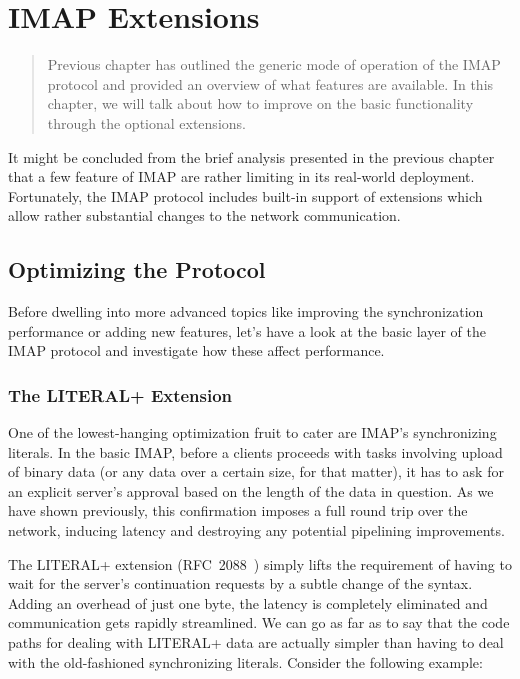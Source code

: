 \documentclass[trojita]{subfiles}
\begin{document}
\chapter{IMAP Extensions}
\label{sec:imap-extensions}

\begin{abstract}
  Previous chapter has outlined the generic mode of operation of the IMAP protocol and provided an overview of what
  features are available.  In this chapter, we will talk about how to improve on the basic functionality through the
  optional extensions.
\end{abstract}

It might be concluded from the brief analysis presented in the previous chapter that a few feature of IMAP are rather
limiting in its real-world deployment.  Fortunately, the IMAP protocol includes built-in support of extensions which
allow rather substantial changes to the network communication.

\section{Optimizing the Protocol}

Before dwelling into more advanced topics like improving the synchronization performance or adding new features, let's
have a look at the basic layer of the IMAP protocol and investigate how these affect performance.

\subsection{The LITERAL+ Extension}
\label{sec:imap-literalplus}

One of the lowest-hanging optimization fruit to cater are IMAP's synchronizing literals.  In the basic IMAP, before a
clients proceeds with tasks involving upload of binary data (or any data over a certain size, for that matter), it has
to ask for an explicit server's approval based on the length of the data in question.  As we have shown previously, this
confirmation imposes a full round trip over the network, inducing latency and destroying any potential pipelining
improvements.

The LITERAL+ extension (RFC~2088~\cite{rfc2088}) simply lifts the requirement of having to wait for the server's
continuation requests by a subtle change of the syntax.  Adding an overhead of just one byte, the latency is completely
eliminated and communication gets rapidly streamlined.  We can go as far as to say that the code paths for dealing with
LITERAL+ data are actually simpler than having to deal with the old-fashioned synchronizing literals.  Consider the
following example:
\end{document}
